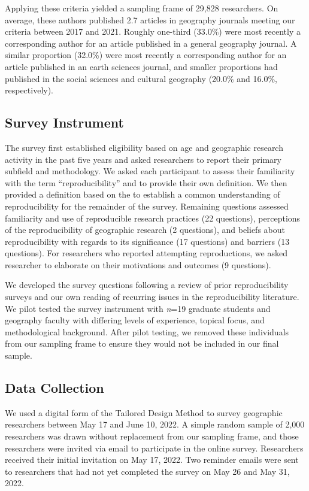 \documentclass[]{interact}
\theoremstyle{plain}%
\theoremstyle{definition}
\theoremstyle{remark}
\begin{document}
Applying these criteria yielded a sampling frame of 29,828 researchers. 
On average, these authors published 2.7 articles in geography journals meeting our criteria between 2017 and 2021. 
Roughly one-third (33.0\%) were most recently a corresponding author for an article published in a general geography journal. 
A similar proportion (32.0\%) were most recently a corresponding author for an article published in an earth sciences journal, and smaller proportions had published in the social sciences and cultural geography (20.0\% and 16.0\%, respectively).

\subsection*{Survey Instrument}
The survey first established eligibility based on age and geographic research activity in the past five years and asked researchers to report their primary subfield and methodology.
We asked each participant to assess their familiarity with the term ``reproducibility'' and to provide their own definition. 
We then provided a definition based on the \citet{NASEM2019} to establish a common understanding of reproducibility for the remainder of the survey.
Remaining questions assessed familiarity and use of reproducible research practices (22 questions), perceptions of the reproducibility of geographic research (2 questions), and beliefs about reproducibility with regards to its significance (17 questions) and barriers (13 questions).
For researchers who reported attempting reproductions, we asked researcher to elaborate on their motivations and outcomes (9 questions).

We developed the survey questions following a review of prior reproducibility surveys \citep[e.g.,][]{fanelli2009many,baker20161, konkol2019} and our own reading of recurring issues in the reproducibility literature. 
We pilot tested the survey instrument with \textit{n}=19 graduate students and geography faculty with differing levels of experience, topical focus, and methodological background. 
After pilot testing, we removed these individuals from our sampling frame to ensure they would not be included in our final sample.

\subsection*{Data Collection}
We used a digital form of the Tailored Design Method \citep{dillman2014internet} to survey geographic researchers between May 17 and June 10, 2022.
A simple random sample of 2,000 researchers was drawn without replacement from our sampling frame, and those researchers were invited via email to participate in the online survey. 
Researchers received their initial invitation on May 17, 2022. 
Two reminder emails were sent to researchers that had not yet completed the survey on May 26 and May 31, 2022.
\end{document}
